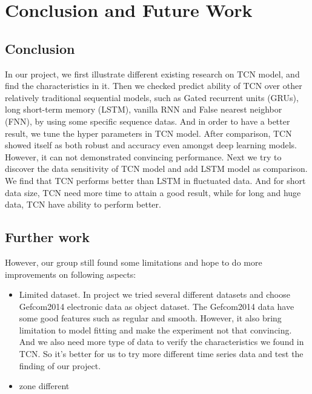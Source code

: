 
\chapter{Conclusion and Future Work} %

\label{Chapter5} %


\section{Conclusion}
In our project, we first illustrate different existing research on TCN model, and find the characteristics in it. Then we checked predict ability of TCN over other relatively traditional sequential models, such as Gated recurrent units (GRUs), long short-term memory (LSTM), vanilla RNN and False nearest neighbor (FNN),  by using some specific sequence datas. And in order to have a better result, we tune the hyper parameters in TCN model. After comparison, TCN showed itself as both robust and accuracy even amongst deep learning models. However, it can not demonstrated convincing performance. Next we try to discover the data sensitivity of TCN model and add LSTM model as comparison. We find that TCN performs better than LSTM in fluctuated data. And for short data size, TCN need more time to attain a good result, while for long and huge data, TCN have ability to perform better.

\section{Further work}
However, our group still found some limitations and hope to do more improvements on following aspects:
\begin{itemize}
    \item Limited dataset. In project we tried several different datasets and choose Gefcom2014 electronic data as object dataset. The Gefcom2014 data have some good features such as regular and smooth. However, it also bring limitation to model fitting and make the experiment not that convincing. And we also need more type of data to verify the characteristics we found in TCN. So it's better for us to try more different time series data and test the finding of our project. 
    \item zone different
\end{itemize}